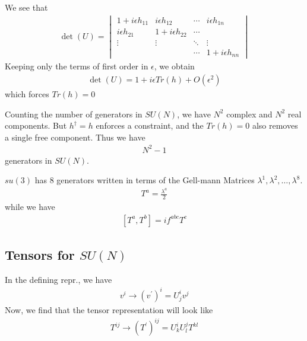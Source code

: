 We see that \begin{align*}
    \det(U) = 
    \begin{vmatrix}
    1 + i \epsilon h_{11} &  i \epsilon h_{12}  & \cdots & i \epsilon h_{1n} \\
    i \epsilon h_{21} & 1 + i \epsilon h_{22}  & \cdots &  \\
    \vdots & \vdots & \ddots & \vdots \\
     &   & \cdots & 1 + i \epsilon h_{nn}
    \end{vmatrix}
\end{align*}
Keeping only the terms of first order in \(\epsilon\), we obtain \begin{align*}
    \det(U) = 1 + i \epsilon Tr(h) + O(\epsilon ^{2} )
\end{align*} 
which forces \(Tr(h) = 0\) 

Counting the number of generators in \(SU(N)\), we have \(N^{2} \) complex and \(N^{2} \) real components. But \(h ^{\dagger}  = h\) enforces a constraint, and the \(Tr(h) = 0\) also removes a single free component. Thus we have \begin{align*}
    N^{2} -1
\end{align*}
generators in \(SU(N)\).

\begin{example}
    \(su(3)\) has 8 generators written in terms of the Gell-mann Matrices \(\lambda ^1, \lambda ^2, \dots, \lambda ^8\). \begin{align*}
        T^a = \frac{\lambda ^a}{2}
    \end{align*}
    while we have \begin{align*}
        \left[ T^a, T^b \right] = i f^{abc} T^c
    \end{align*}
\end{example}

\subsection{Tensors for \(SU(N)\)}
In the defining repr., we have \begin{align*}
    v ^i \to (v^{\prime} )^i = U^i _j v^j
\end{align*}
Now, we find that the tensor representation will look like \begin{align*}
    T^{ij} \to \left( T ^{\prime}  \right) ^{i j} = U ^i _k U^j _l T^{kl}
\end{align*}

